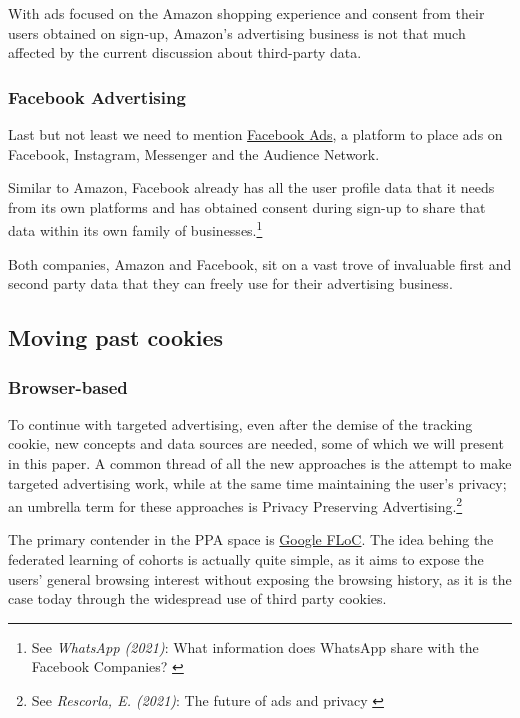 With ads focused on the Amazon shopping experience and consent from their users obtained on sign-up, Amazon's advertising business is not that much affected by the current discussion about third-party data.

\subsubsection{Facebook Advertising}

Last but not least we need to mention \href{https://www.facebook.com/business/ads}{Facebook Ads}, a platform to place ads on Facebook, Instagram, Messenger and the Audience Network.

Similar to Amazon, Facebook already has all the user profile data that it needs from its own platforms and has obtained consent during sign-up to share that data within its own family of businesses.\footnote{See \textit{WhatsApp (2021)}: What information does WhatsApp share with the Facebook Companies? \cite{whatsApp}}

Both companies, Amazon and Facebook, sit on a vast trove of invaluable first and second party data that they can freely use for their advertising business.

\subsection{Moving past cookies}

\subsubsection{Browser-based}

To continue with targeted advertising, even after the demise of the tracking cookie, new concepts and data sources are needed, some of which we will present in this paper. A common thread of all the new approaches is the attempt to make targeted advertising work, while at the same time maintaining the user's privacy; an umbrella term for these approaches is Privacy Preserving Advertising.\footnote{See \textit{Rescorla, E. (2021)}: The future of ads and privacy \cite{futureAds}}

The primary contender in the PPA space is \href{https://wicg.github.io/floc/}{Google FLoC}. The idea behing the federated learning of cohorts is actually quite simple, as it aims to expose the users' general browsing interest without exposing the browsing history, as it is the case today through the widespread use of third party cookies.


